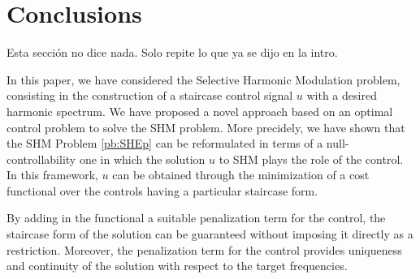 \documentclass[twocolumn]{autart}    %
\begin{document}
\section{Conclusions}\label{sec:conclusions}

{\color{red} Esta sección no dice nada. Solo repite lo que ya se dijo en la intro.}

In this paper, we have considered the Selective Harmonic Modulation problem, consisting in the construction of a staircase control signal $u$ with a desired harmonic spectrum. We have proposed a novel approach based on an optimal control problem to solve the SHM problem. 
More precidely, we have shown that the SHM Problem \ref{pb:SHEp} can be reformulated in terms of a null-controllability one in which the solution $u$ to SHM plays the role of the control. In this framework, $u$ can  be obtained through the minimization of a cost functional over the controls having a particular staircase form. 

By  adding in the functional a suitable penalization term for the control, the staircase form of the solution can be guaranteed without imposing it directly as a restriction.
Moreover, the penalization term for the control provides uniqueness and continuity of the solution with respect to the target frequencies. 
\end{document}

